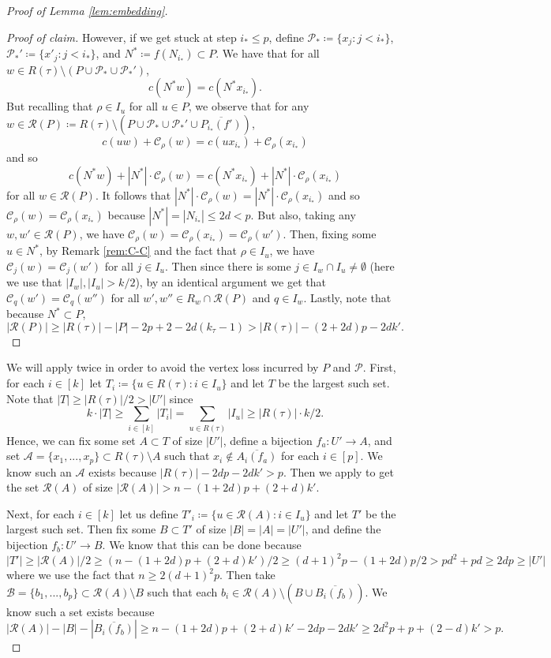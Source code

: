 \documentclass{article}
\newcommand{\cA}{\mathcal{A} }
\newcommand{\cB}{\mathcal{B} }
\newcommand{\cC}{\mathcal{C} }
\newcommand{\cP}{\mathcal{P} }
\newcommand{\cR}{\mathcal{R} }
\theoremstyle{definition}
\newenvironment{subproof}[1][\proofname]{%
  \renewcommand{\qedsymbol}{$\blacksquare$}%
  \begin{proof}[#1]%
}{%
  \end{proof}%
}
\begin{document}
\begin{proof}[Proof of Lemma \ref{lem:embedding}]
\begin{subproof}[Proof of claim]
However, if we get stuck at step $i_*\leq p$, define $\cP_{*}\coloneqq \{x_j:j<i_*\}$, $\cP_{*}'\coloneqq \{x'_j:j<i_*\}$,  and $N^*\coloneqq f(N_{i_*})\subset P$. We have that for all $w\in R(\tau)\setminus (P\cup \cP_{*}\cup \cP_*')$, $$c(N^*w)=c(N^*x_{i_*}).$$ 
But recalling that $\rho\in I_u$ for all $u\in P$, we observe that for any $w\in \cR(P)\coloneqq R(\tau)\setminus (P\cup \cP_{*} \cup \cP_{*}' \cup \overline{P_{i_*}(f')})$, $$c(uw)+\cC_\rho(w)=c(ux_{i_*})+\cC_\rho(x_{i_*})$$ and so \begin{equation}\label{N^*}
c(N^*w)+|N^*|\cdot\cC_\rho(w)=c(N^*x_{i_*})+|N^*|\cdot\cC_\rho(x_{i_*})
\end{equation} for all $w\in \cR(P)$. It follows that $|N^*|\cdot\cC_\rho(w)=|N^*|\cdot\cC_\rho(x_{i_*})$ and so $\cC_\rho(w)=\cC_\rho(x_{i_*})$ because $|N^*|=|N_{i_*}|\leq 2d <p$. But also, taking any $w,w'\in \cR(P)$, we have $\cC_\rho(w)=\cC_\rho(x_{i_*})=\cC_\rho(w')$. Then, fixing some $u\in N^*$, by Remark \ref{rem:C-C} and the fact that $\rho \in I_u$, we have $\cC_j(w)=\cC_j(w')$ for all $j\in I_u$. Then since there is some $j\in I_w\cap I_u\neq \emptyset$ (here we use that $|I_w|,|I_u|> k/2$), by an identical argument we get that $\cC_q(w')=\cC_q(w'')$ for all $w',w''\in R_{w}\cap \cR(P)$ and $q\in I_w$. Lastly, note that because $N^*\subset P$, $$|\cR(P)|\geq  |R(\tau)|-|P|-2p+2-2d(k_\tau-1)> |R(\tau)|-(2+2d)p-2dk'.$$
\end{subproof}

We will apply  twice in order to avoid the vertex loss incurred by $P$ and $\cP$. First, for each $i\in [k]$ let $T_i\coloneqq \{u\in R(\tau):i\in I_u\}$ and let $T$ be the largest such set. Note that $|T|\geq |R(\tau)|/2> |U'|$ since $$k\cdot |T|\geq \sum_{ i\in[k]}|T_i| = \sum_{u\in R(\tau)} |I_u| \geq |R(\tau)|\cdot k/2.$$
Hence, we can fix some set $A\subset T$ of size $|U'|$, define a bijection $f_a:U'\to A$, and set $\cA=\{x_1,...,x_p\}\subset R(\tau)\setminus A$ such that $x_i\notin \overline{A_i(f_a)}$ for each $i\in [p]$. We know such an $\cA$ exists because $|R(\tau)|-2dp-2dk'>p$. Then we apply  to get the set $\cR(A)$ of size $|\cR(A)|>n-(1+2d)p+(2+d)k'$.

Next, for each $i\in [k]$ let us define $T'_i\coloneqq \{u\in \cR(A):i\in I_u\}$ and let $T'$ be the largest such set. Then fix some $B\subset T'$ of size $|B|=|A|=|U'|$, and define the bijection $f_b:U'\to B$. We know that this can be done because $$|T'|\geq |\cR(A)|/2 \geq (n- (1+2d)p +(2+d)k')/2\geq (d+1)^2p-(1+2d)p/2> pd^2+pd\geq 2dp \geq |U'|$$ where we use the fact that $n\geq 2(d+1)^2p$. Then take $\cB=\{b_1,...,b_p\}\subset \cR(A)\setminus B$
such that each $b_i\in \cR(A)\setminus (B\cup \overline{B_{i}(f_b)})$. We know such a set exists because $$|\cR(A)|-|B|-|\overline{B_{i}(f_b)}|\geq n- (1+2d)p +(2+d)k'-2dp-2dk'\geq 2d^2p+p+(2-d)k'> p.$$ 


\end{proof}
\end{document}
